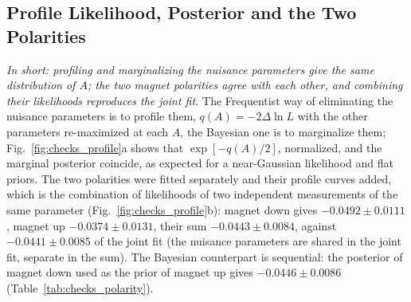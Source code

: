 \subsection{Profile Likelihood, Posterior and the Two Polarities}
\label{sec:checks_profile}
\emph{In short: profiling and marginalizing the nuisance parameters give the same distribution of $A$; the two magnet polarities agree with each other, and combining their likelihoods reproduces the joint fit.}
The Frequentist way of eliminating the nuisance parameters is to profile them, $q(A)=-2\Delta\ln L$ with the other parameters re-maximized at each $A$, the Bayesian one is to marginalize them; Fig.~\ref{fig:checks_profile}a shows that $\exp[-q(A)/2]$, normalized, and the marginal posterior coincide, as expected for a near-Gaussian likelihood and flat priors. The two polarities were fitted separately and their profile curves added, which is the combination of likelihoods of two independent measurements of the same parameter (Fig.~\ref{fig:checks_profile}b): magnet down gives $-0.0492\pm0.0111$, magnet up $-0.0374\pm0.0131$, their sum $-0.0443\pm0.0084$, against $-0.0441\pm0.0085$ of the joint fit (the nuisance parameters are shared in the joint fit, separate in the sum). The Bayesian counterpart is sequential: the posterior of magnet down used as the prior of magnet up gives $-0.0446\pm0.0086$ (Table~\ref{tab:checks_polarity}).

\begin{table}[h]
\centering
{}
\caption{$\Araw$ for the two magnet polarities and their combination, by the two methods; the Frequentist combination is the sum of the profile likelihoods of the two polarities, the Bayesian one the sequential update of the posterior.}
\label{tab:checks_polarity}
\end{table}

